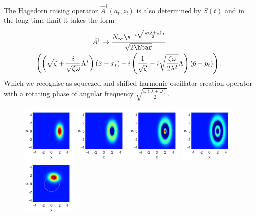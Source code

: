 \documentclass[12pt]{iopart} %
\begin{document}
The Hagedorn raising operator $\hat{A}^{\dagger}(a_t,z_t)$ is also determined by $S(t)$ and in the long time limit it takes the form
\begin{multline}
    \hat{A}^{\dagger}\to \frac{N_{\infty}\e^{-i\sqrt{\frac{\omega(\lambda+\omega)}{2}}t}}{\sqrt{2 \hbar}}\\
    \left(\left(\sqrt{\zeta}+\frac{i}{\sqrt{\zeta \omega}}\Lambda^{*} \right)(\hat  x-x_t )-i\left(\frac{1}{\sqrt{\zeta}}-i\sqrt{\frac{\zeta \omega}{2 \lambda^2}}\Lambda \right) (\hat p-p_t) \right).
\end{multline}
Which we recognise as squeezed and shifted harmonic oscillator creation operator with a rotating phase of angular frequency $\sqrt{\tfrac{\omega(\lambda+\omega)}{2}}$.
\begin{figure}
\begin{centering}
  	  \includegraphics[width=0.24\textwidth]{State0t0Pos.pdf}
	  \includegraphics[width=0.24\textwidth]{State1t0Pos.pdf}
	  \includegraphics[width=0.24\textwidth]{State2t0Pos.pdf}
	  \includegraphics[width=0.24\textwidth]{State3t0Pos.pdf}\\
	  \includegraphics[width=0.24\textwidth]{State0t5Pos.pdf}

\end{centering}
\end{figure}
\end{document}
